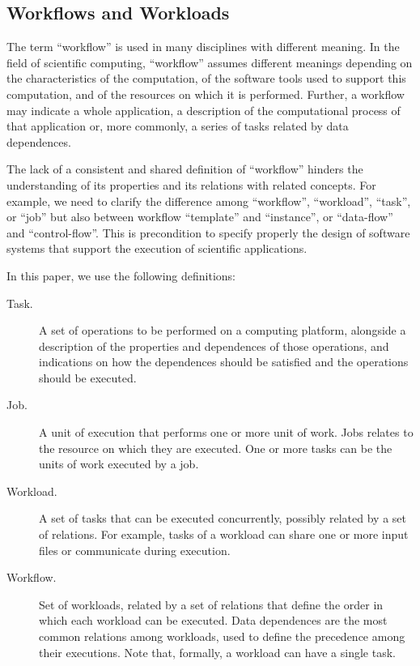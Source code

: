 \subsection{Workflows and Workloads}

The term ``workflow'' is used in many disciplines with different meaning. In the
field of scientific computing, ``workflow'' assumes different meanings depending
on the characteristics of the computation, of the software tools used to support
this computation, and of the resources on which it is performed. Further, a
workflow may indicate a whole application, a description of the computational
process of that application or, more commonly, a series of tasks related by data
dependences.

The lack of a consistent and shared definition of ``workflow'' hinders the
understanding of its properties and its relations with related concepts. For
example, we need to clarify the difference among ``workflow'', ``workload'',
``task'', or ``job'' but also between workflow ``template'' and ``instance'', or
``data-flow'' and ``control-flow''. This is precondition to specify properly the
design of software systems that support the execution of scientific
applications.

In this paper, we use the following definitions:

\begin{description}

  \item[Task.] A set of operations to be performed on a computing platform,
  alongside a description of the properties and dependences of those operations,
  and indications on how the dependences should be satisfied and the operations
  should be executed.

  \item[Job.] A unit of execution that performs one or more unit of work. Jobs
  relates to the resource on which they are executed. One or more tasks can be
  the units of work executed by a job.

  \item[Workload.] A set of tasks that can be executed concurrently, possibly
  related by a set of relations. For example, tasks of a workload can share one
  or more input files or communicate during execution.

  \item[Workflow.] Set of workloads, related by a set of relations that define
  the order in which each workload can be executed. Data dependences are the
  most common relations among workloads, used to define the precedence among
  their executions. Note that, formally, a workload can have a single task.

\end{description}

